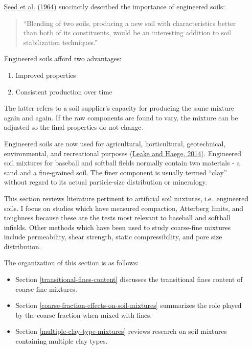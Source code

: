 \documentclass[
  letterpaper,
  openany]{book}
\providecommand{\tightlist}{%
  \setlength{\itemsep}{0pt}\setlength{\parskip}{0pt}}
\renewenvironment{leftbar}{\def\FrameCommand{\color{grey30}\vrule width 1pt \hspace{10pt}}\MakeFramed {\advance\hsize-\width \FrameRestore}}{\endMakeFramed}
\renewenvironment{quote}%
{\begin{leftbar} \begin{quotation} \noindent \small }%
{\end{quotation}\end{leftbar}}
\begin{document}
\protect\hyperlink{ref-Seed1964a}{Seed et al.} (\protect\hyperlink{ref-Seed1964a}{1964}) succinctly described the importance of engineered soils:

\begin{quote}
``Blending of two soils, producing a new soil with characteristics better than both of its constituents, would be an interesting addition to soil stabilization techniques.''
\end{quote}

Engineered soils afford two advantages:

\begin{enumerate}
\def\labelenumi{\arabic{enumi}.}
\tightlist
\item
  Improved properties
\item
  Consistent production over time
\end{enumerate}

The latter refers to a soil supplier's capacity for producing the same mixture again and again.
If the raw components are found to vary, the mixture can be adjusted so the final properties do not change.

Engineered soils are now used for agricultural, horticultural, geotechnical, environmental, and recreational purposes (\protect\hyperlink{ref-Leake2014}{Leake and Haege, 2014}).
Engineered soil mixtures for baseball and softball fields normally contain two materials - a sand and a fine-grained soil. The finer component is usually termed ``clay'' without regard to its actual particle-size distribution or mineralogy.

This section reviews literature pertinent to artificial soil mixtures, i.e.~engineered soils.
I focus on studies which have measured compaction, Atterberg limits, and toughness because these are the tests most relevant to baseball and softball infields.
Other methods which have been used to study coarse-fine mixtures include permeability, shear strength, static compressibility, and pore size distribution.

The organization of this section is as follows:

\begin{itemize}
\item
  Section \ref{transitional-fines-content} discusses the transitional fines content of coarse-fine mixtures.
\item
  Section \ref{coarse-fraction-effects-on-soil-mixtures} summarizes the role played by the coarse fraction when mixed with fines.
\item
  Section \ref{multiple-clay-type-mixtures} reviews research on soil mixtures containing multiple clay types.
\end{itemize}
\end{document}
